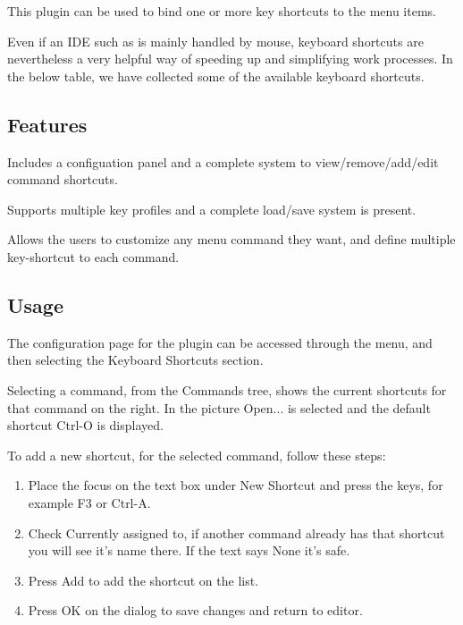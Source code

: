This plugin can be used to bind one or more key shortcuts to the menu items.

Even if an IDE such as \codeblocks is mainly handled by mouse, keyboard shortcuts are nevertheless a very helpful way of speeding up and simplifying work processes. In the below table, we have collected some of the available keyboard shortcuts.

\subsection{Features}
\begin{description}
\item Includes a configuation panel and a complete system to view/remove/add/edit command shortcuts.
\item Supports multiple key profiles and a complete load/save system is present.
\item Allows the users to customize any menu command they want, and define multiple key-shortcut to each command.
\end{description}

\subsection{Usage}

The configuration page for the plugin can be accessed through the  menu, and then selecting the Keyboard Shortcuts section.


Selecting a command, from the Commands tree, shows the current shortcuts for that command on the right. In the picture Open... is selected and the default shortcut Ctrl-O is displayed.

To add a new shortcut, for the selected command, follow these steps:

\begin{enumerate}
\item Place the focus on the text box under New Shortcut and press the keys, for example F3 or Ctrl-A.
\item Check Currently assigned to, if another command already has that shortcut you will see it's name there. If the text says None it's safe.
\item Press Add to add the shortcut on the list.
\item Press OK on the dialog to save changes and return to editor.
\end{enumerate}
    



